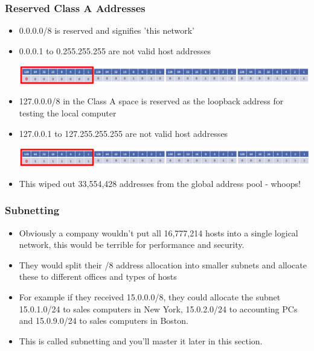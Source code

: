 \documentclass[pdflatex,compress]{beamer}
\begin{document}
\begin{frame}
	\frametitle{Reserved Class A Addresses}
	\begin{itemize}
		\item 0.0.0.0/8 is reserved and signifies 'this network'
		\item 0.0.0.1 to 0.255.255.255 are not valid host addresses
		\begin{center}
			\includegraphics[width=1\linewidth]{img/img03}
		\end{center}
		\item 127.0.0.0/8 in the Class A space is reserved as the loopback address
		for testing the local computer
		\item 127.0.0.1 to 127.255.255.255 are not valid host addresses
		\begin{center}
			\includegraphics[width=1\linewidth]{img/img04}
		\end{center}
		\item This wiped out 33,554,428 addresses from the global address pool - whoops!
	\end{itemize}
\end{frame}

\begin{frame}
	\frametitle{Subnetting}
	\begin{itemize}
		\item Obviously a company wouldn't put all 16,777,214 hosts into a single logical network, this would be terrible for performance and security.
		\item They would split their /8 address allocation into smaller subnets and allocate these to different offices and types of hosts
		\item For example if they received 15.0.0.0/8, they could allocate the subnet 15.0.1.0/24 to sales computers in New York, 15.0.2.0/24 to accounting PCs and 15.0.9.0/24 to sales computers in Boston.
		\item This is called subnetting and you’ll master it later in this section.
	\end{itemize}
\end{frame}
\end{document}

